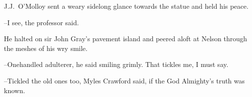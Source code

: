 
J.J.~O'Molloy sent a weary sidelong glance towards the statue
and held his peace.

--I see,
the professor said.

He halted on sir John Gray's pavement island
and peered aloft at Nelson through the meshes of his wry smile.



--Onehandled adulterer,
he said smiling grimly.
That tickles me, I must say.

--Tickled the old ones too,
Myles Crawford said,
if the God Almighty's truth was known.


